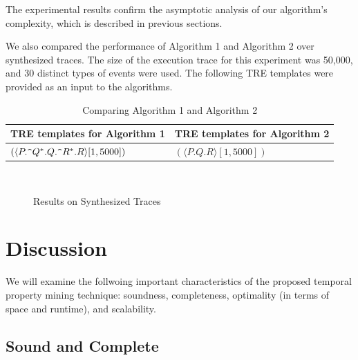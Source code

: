 \documentclass[]{sigplanconf}
\begin{document}
The experimental results confirm the asymptotic analysis of our algorithm's complexity, which is described in previous sections.

We also compared the performance of Algorithm 1 and Algorithm 2 over synthesized traces. The size of the execution trace for this experiment was 50,000, and 30 distinct types of events were used. The following TRE templates were provided as an input to the algorithms.

\begin{table}[t]
	\centering
	\begin{tabular}{|l|l|}
		\hline
		\textbf{TRE templates for Algorithm 1} & \textbf{TRE templates for Algorithm 2} \\
		\hline
		 $(\langle P.\verb!^!Q^*.Q.\verb!^!R^*.R \rangle [1, 5000])$& $(\langle P.Q.R \rangle [1, 5000])$ \\
	\end{tabular}

	\caption{Comparing Algorithm 1 and Algorithm 2}
	\label{miningOverhead}
\end{table}

\begin{figure}
  \centering
  \\
  \caption{Results on Synthesized Traces}
\end{figure}


\section{Discussion} \label{discussion}

We will examine the follwoing important characteristics of the proposed temporal property mining technique: soundness, completeness, optimality (in terms of space and runtime), and scalability.


\subsection{Sound and Complete}
\end{document}
